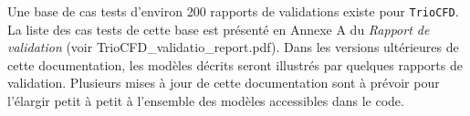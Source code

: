 Une base de cas tests d'environ 200 rapports de validations existe pour \texttt{TrioCFD}.
La liste des cas tests de cette base est pr\'esent\'e en Annexe A
du \emph{Rapport de validation} (voir TrioCFD\_validatio\_report.pdf).
Dans les versions ult\'erieures de cette documentation, les mod\`eles d\'ecrits seront
illustr\'es par quelques rapports de validation.
Plusieurs mises \`a jour de cette documentation sont \`a pr\'evoir pour l'\'elargir
petit \`a petit \`a l'ensemble des mod\`eles accessibles dans le code.
